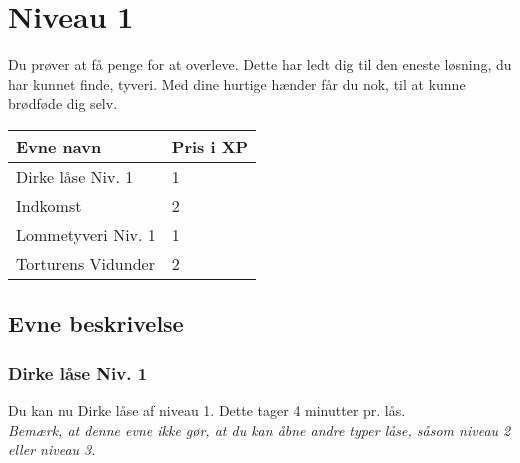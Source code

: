 \chapter{Niveau 1}
Du prøver at få penge for at overleve. Dette har ledt dig til den eneste løsning, du har kunnet finde, tyveri. Med dine hurtige hænder får du nok, til at kunne brødføde dig selv.
\begin{table}[H]
    \centering
    \begin{tabular}{|p{}|p{}|}
    \rowcolor{cerulean!80}\hline
        Evne navn & Pris i XP \\\hline
         Dirke låse Niv. 1 & 1 \\\hline
         Indkomst & 2 \\\hline
         Lommetyveri Niv. 1 & 1\\\hline
         Torturens Vidunder & 2 \\
         \hline
    \end{tabular}
\end{table}

\section{Evne beskrivelse}

\subsection{Dirke låse Niv. 1}
Du kan nu Dirke låse af niveau 1. Dette tager 4 minutter pr. lås.\\
\emph{Bemærk, at denne evne ikke gør, at du kan åbne andre typer låse, såsom niveau 2 eller niveau 3.}\\





